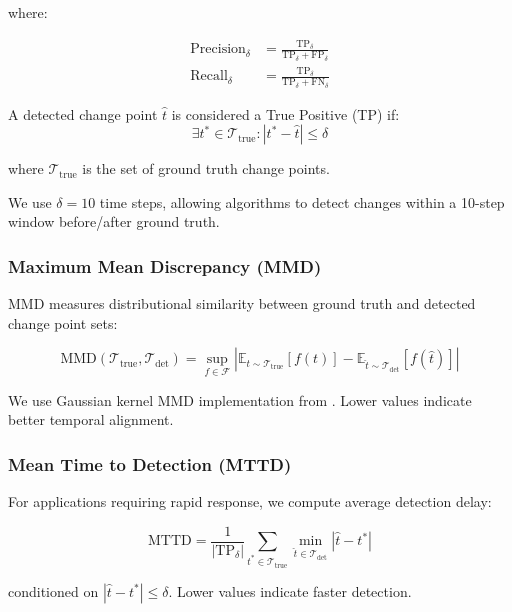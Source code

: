 where:

\begin{align}
\text{Precision}_\delta &= \frac{\text{TP}_\delta}{\text{TP}_\delta + \text{FP}_\delta} \\
\text{Recall}_\delta &= \frac{\text{TP}_\delta}{\text{TP}_\delta + \text{FN}_\delta}
\end{align}

A detected change point $\hat{t}$ is considered a True Positive (TP) if:
\begin{equation}
\exists t^* \in \mathcal{T}_{\text{true}} : |t^* - \hat{t}| \leq \delta
\end{equation}

where $\mathcal{T}_{\text{true}}$ is the set of ground truth change points.

We use $\delta = 10$ time steps, allowing algorithms to detect changes within a 10-step window before/after ground truth.

\subsubsection{Maximum Mean Discrepancy (MMD)}

MMD measures distributional similarity between ground truth and detected change point sets:

\begin{equation}
\text{MMD}(\mathcal{T}_{\text{true}}, \mathcal{T}_{\text{det}}) = \sup_{f \in \mathcal{F}} \left| \mathbb{E}_{t \sim \mathcal{T}_{\text{true}}}[f(t)] - \mathbb{E}_{\hat{t} \sim \mathcal{T}_{\text{det}}}[f(\hat{t})] \right|
\end{equation}

We use Gaussian kernel MMD implementation from \cite{gretton2012kernel}. Lower values indicate better temporal alignment.

\subsubsection{Mean Time to Detection (MTTD)}

For applications requiring rapid response, we compute average detection delay:

\begin{equation}
\text{MTTD} = \frac{1}{|\text{TP}_\delta|} \sum_{t^* \in \mathcal{T}_{\text{true}}} \min_{\hat{t} \in \mathcal{T}_{\text{det}}} |\hat{t} - t^*|
\end{equation}

conditioned on $|\hat{t} - t^*| \leq \delta$. Lower values indicate faster detection.

